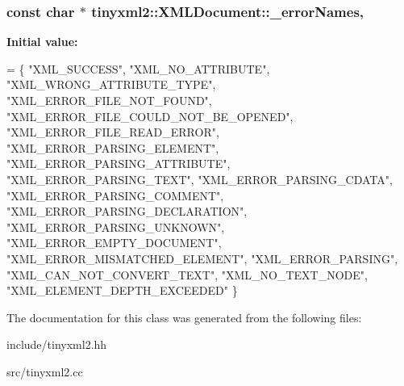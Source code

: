 \subsubsection[{\texorpdfstring{\+\_\+error\+Names}{_errorNames}}]{\setlength{\rightskip}{0pt plus 5cm}const char $\ast$ tinyxml2\+::\+X\+M\+L\+Document\+::\+\_\+error\+Names\hspace{0.3cm}{\ttfamily [static]}, {\ttfamily [private]}}\hypertarget{classtinyxml2_1_1XMLDocument_af006d806fd8e1f6e74933ee9c062de4a}{}\label{classtinyxml2_1_1XMLDocument_af006d806fd8e1f6e74933ee9c062de4a}
{\bfseries Initial value\+:}
\begin{DoxyCode}
= \{
    \textcolor{stringliteral}{"XML\_SUCCESS"},
    \textcolor{stringliteral}{"XML\_NO\_ATTRIBUTE"},
    \textcolor{stringliteral}{"XML\_WRONG\_ATTRIBUTE\_TYPE"},
    \textcolor{stringliteral}{"XML\_ERROR\_FILE\_NOT\_FOUND"},
    \textcolor{stringliteral}{"XML\_ERROR\_FILE\_COULD\_NOT\_BE\_OPENED"},
    \textcolor{stringliteral}{"XML\_ERROR\_FILE\_READ\_ERROR"},
    \textcolor{stringliteral}{"XML\_ERROR\_PARSING\_ELEMENT"},
    \textcolor{stringliteral}{"XML\_ERROR\_PARSING\_ATTRIBUTE"},
    \textcolor{stringliteral}{"XML\_ERROR\_PARSING\_TEXT"},
    \textcolor{stringliteral}{"XML\_ERROR\_PARSING\_CDATA"},
    \textcolor{stringliteral}{"XML\_ERROR\_PARSING\_COMMENT"},
    \textcolor{stringliteral}{"XML\_ERROR\_PARSING\_DECLARATION"},
    \textcolor{stringliteral}{"XML\_ERROR\_PARSING\_UNKNOWN"},
    \textcolor{stringliteral}{"XML\_ERROR\_EMPTY\_DOCUMENT"},
    \textcolor{stringliteral}{"XML\_ERROR\_MISMATCHED\_ELEMENT"},
    \textcolor{stringliteral}{"XML\_ERROR\_PARSING"},
    \textcolor{stringliteral}{"XML\_CAN\_NOT\_CONVERT\_TEXT"},
    \textcolor{stringliteral}{"XML\_NO\_TEXT\_NODE"},
    \textcolor{stringliteral}{"XML\_ELEMENT\_DEPTH\_EXCEEDED"}
\}
\end{DoxyCode}


The documentation for this class was generated from the following files\+:\begin{DoxyCompactItemize}
\item 
include/tinyxml2.\+hh\item 
src/tinyxml2.\+cc\end{DoxyCompactItemize}
